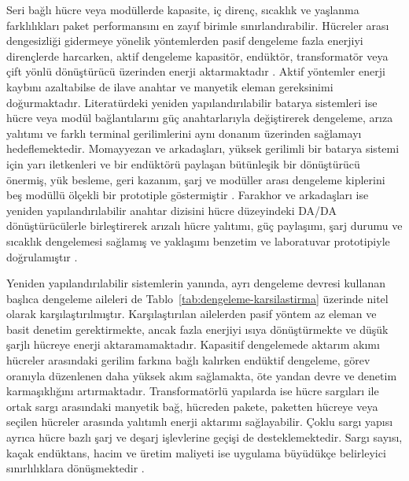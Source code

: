 Seri bağlı hücre veya modüllerde kapasite, iç direnç, sıcaklık ve yaşlanma farklılıkları paket performansını en zayıf birimle sınırlandırabilir. Hücreler arası dengesizliği gidermeye yönelik yöntemlerden pasif dengeleme fazla enerjiyi dirençlerde harcarken, aktif dengeleme kapasitör, endüktör, transformatör veya çift yönlü dönüştürücü üzerinden enerji aktarmaktadır \citep{Daowd2011,Khan2024}. Aktif yöntemler enerji kaybını azaltabilse de ilave anahtar ve manyetik eleman gereksinimi doğurmaktadır. Literatürdeki yeniden yapılandırılabilir batarya sistemleri ise hücre veya modül bağlantılarını güç anahtarlarıyla değiştirerek dengeleme, arıza yalıtımı ve farklı terminal gerilimlerini aynı donanım üzerinden sağlamayı hedeflemektedir. Momayyezan ve arkadaşları, yüksek gerilimli bir batarya sistemi için yarı iletkenleri ve bir endüktörü paylaşan bütünleşik bir dönüştürücü önermiş, yük besleme, geri kazanım, şarj ve modüller arası dengeleme kiplerini beş modüllü ölçekli bir prototiple göstermiştir \citep{Momayyezan2016}. Farakhor ve arkadaşları ise yeniden yapılandırılabilir anahtar dizisini hücre düzeyindeki DA/DA dönüştürücülerle birleştirerek arızalı hücre yalıtımı, güç paylaşımı, şarj durumu ve sıcaklık dengelemesi sağlamış ve yaklaşımı benzetim ve laboratuvar prototipiyle doğrulamıştır \citep{Farakhor2023}.

Yeniden yapılandırılabilir sistemlerin yanında, ayrı dengeleme devresi kullanan başlıca dengeleme aileleri de Tablo~\ref{tab:dengeleme-karsilastirma} üzerinde nitel olarak karşılaştırılmıştır. Karşılaştırılan ailelerden pasif yöntem az eleman ve basit denetim gerektirmekte, ancak fazla enerjiyi ısıya dönüştürmekte ve düşük şarjlı hücreye enerji aktaramamaktadır. Kapasitif dengelemede aktarım akımı hücreler arasındaki gerilim farkına bağlı kalırken endüktif dengeleme, görev oranıyla düzenlenen daha yüksek akım sağlamakta, öte yandan devre ve denetim karmaşıklığını artırmaktadır. Transformatörlü yapılarda ise hücre sargıları ile ortak sargı arasındaki manyetik bağ, hücreden pakete, paketten hücreye veya seçilen hücreler arasında yalıtımlı enerji aktarımı sağlayabilir. Çoklu sargı yapısı ayrıca hücre bazlı şarj ve deşarj işlevlerine geçişi de desteklemektedir. Sargı sayısı, kaçak endüktans, hacim ve üretim maliyeti ise uygulama büyüdükçe belirleyici sınırlılıklara dönüşmektedir \citep{Daowd2011,Khan2024}.

